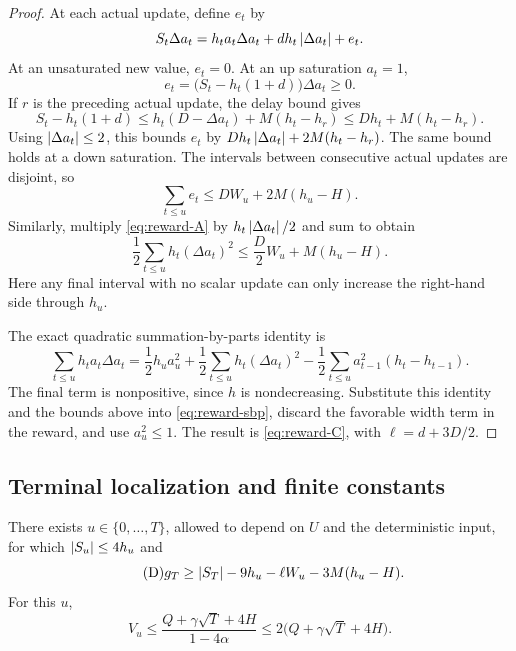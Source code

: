 \begin{proof}
At each actual update, define $e_t$ by
\[
 S_t\Delta a_t=h_t a_t\Delta a_t
                  +dh_t\left|\Delta a_t\right|+e_t.
\]
At an unsaturated new value, $e_t=0$. At an up saturation $a_t=1$,
\[
 e_t=\bigl(S_t-h_t(1+d)\bigr)\Delta a_t\ge0.
\]
If $r$ is the preceding actual update, the delay bound gives
\[
 S_t-h_t(1+d)
 \le h_t(D-\Delta a_t)+M(h_t-h_r)
 \le Dh_t+M(h_t-h_r).
\]
Using $\left|\Delta a_t\right|\le2$, this bounds $e_t$ by
$Dh_t\left|\Delta a_t\right|+2M(h_t-h_r)$. The same bound holds at a down
saturation. The intervals between consecutive actual updates are disjoint,
so
\[
 \sum_{t\le u}e_t\le DW_u+2M(h_u-H).
\]
Similarly, multiply \eqref{eq:reward-A} by
$h_t\left|\Delta a_t\right|/2$ and sum to obtain
\[
 \frac12\sum_{t\le u}h_t(\Delta a_t)^2
 \le\frac D2W_u+M(h_u-H).
\]
Here any final interval with no scalar update can only increase the
right-hand side through $h_u$.

The exact quadratic summation-by-parts identity is
\[
 \sum_{t\le u}h_t a_t\Delta a_t
 =\frac12h_u a_u^2
  +\frac12\sum_{t\le u}h_t(\Delta a_t)^2
  -\frac12\sum_{t\le u}a_{t-1}^2(h_t-h_{t-1}).
\]
The final term is nonpositive, since $h$ is nondecreasing. Substitute
this identity and the bounds above into \eqref{eq:reward-sbp}, discard
the favorable width term in the reward, and use $a_u^2\le1$. The result
is \eqref{eq:reward-C}, with $\ell=d+3D/2$.
\end{proof}

\subsection{Terminal localization and finite constants}

\begin{lemma}\label{lem:reward-terminal}
There exists $u\in\{0,\ldots,T\}$, allowed to depend on $U$ and the
deterministic input, for which $\left|S_u\right|\le4h_u$ and
\begin{equation}\tag{D}\label{eq:reward-D}
 g_T\ge\left|S_T\right|-9h_u-\ell W_u-3M(h_u-H).
\end{equation}
For this $u$,
\begin{equation}\tag{E}\label{eq:reward-E}
 V_u\le\frac{Q+\gamma\sqrt T+4H}{1-4\alpha}
      \le2\bigl(Q+\gamma\sqrt T+4H\bigr).
\end{equation}
\end{lemma}

